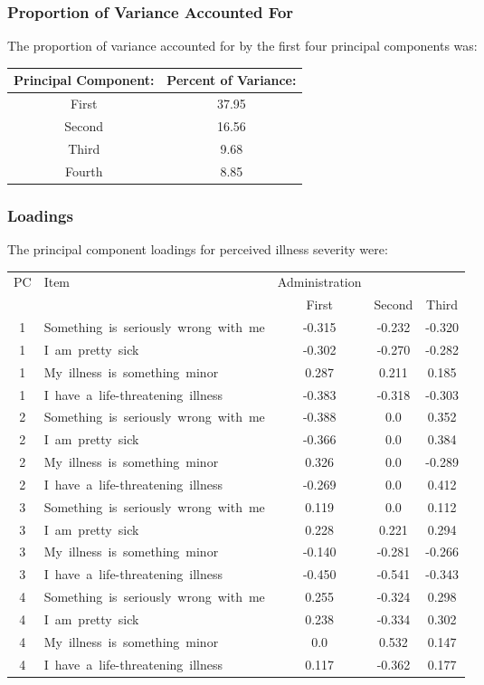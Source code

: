 \documentclass[12pt]{article}
\begin{document}
\subsubsection*{Proportion of Variance Accounted For}
The proportion of variance accounted for by the first four principal components was:
\par\vspace{0.3 cm}
\begin{tabular}{cc} Principal Component: & Percent of Variance:\\
\hline
First  & 37.95\\
Second & 16.56\\
Third  &  9.68\\
Fourth &  8.85
\end{tabular}
\par\vspace{0.3 cm}
\subsubsection*{Loadings}
The principal component loadings for perceived illness severity were:
\par\vspace{0.3 cm}
\begin{tabular}{clccc}
PC & Item &Administration \\
   &      & First & Second & Third\\
\hline
1 & \mbox{Something is seriously wrong with me} & -0.315 & -0.232 & -0.320\\
1 & \mbox{I am pretty sick} & -0.302 & -0.270 & -0.282\\
1 & \mbox{My illness is something minor} & 0.287 & 0.211 & 0.185\\
1 & \mbox{I have a life-threatening illness} & -0.383 & -0.318 & -0.303\\
\hline
2 & \mbox{Something is seriously wrong with me} & -0.388 & 0.0 &0.352  \\
2 & \mbox{I am pretty sick} & -0.366 & 0.0 & 0.384\\
2 & \mbox{My illness is something minor} & 0.326 & 0.0 & -0.289\\
2 & \mbox{I have a life-threatening illness} & -0.269 & 0.0 & 0.412\\
\hline
3 & \mbox{Something is seriously wrong with me} & 0.119 & 0.0 & 0.112\\
3 & \mbox{I am pretty sick} & 0.228 & 0.221 & 0.294\\
3 & \mbox{My illness is something minor} & -0.140 & -0.281 & -0.266\\
3 & \mbox{I have a life-threatening illness} & -0.450 & -0.541 & -0.343\\
\hline
4 & \mbox{Something is seriously wrong with me} & 0.255 & -0.324 & 0.298  \\
4 & \mbox{I am pretty sick} & 0.238 & -0.334 & 0.302\\
4 & \mbox{My illness is something minor} & 0.0 & 0.532 & 0.147\\
4 & \mbox{I have a life-threatening illness} & 0.117 & -0.362  & 0.177\\
\end{tabular}
\par\vspace{0.3 cm}
\end{document}
